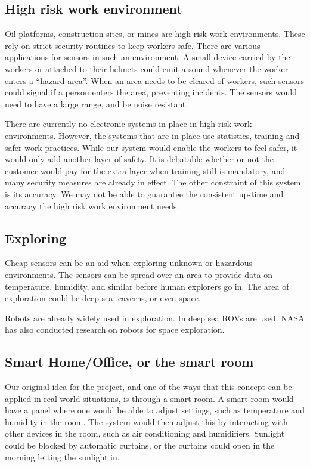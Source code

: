\documentclass[../document.tex]{subfiles}
\begin{document}
\subsection*{High risk work environment}
Oil platforms, construction sites, or mines are high risk work environments. These rely on strict security routines to keep workers safe. There are various applications for sensors in such an environment. A small device carried by the workers or attached to their helmets could emit a sound whenever the worker enters a ``hazard area''. When an area needs to be cleared of workers, such sensors could signal if a person enters the area, preventing incidents. The sensors would need to have a large range, and be noise resistant.

There are currently no electronic systems in place in high risk work environments. However, the systems that are in place use statistics, training and safer work practices. While our system would enable the workers to feel safer, it would only add another layer of safety. It is debatable whether or not the customer would pay for the extra layer when training still is mandatory, and many security measures are already in effect. The other constraint of this system is its accuracy. We may not be able to guarantee the consistent up-time and accuracy the high risk work environment needs.

\subsection*{Exploring}
Cheap sensors can be an aid when exploring unknown or hazardous environments. The sensors can be spread over an area to provide data on temperature, humidity, and similar before human explorers go in. The area of exploration could be deep sea, caverns, or even space.

Robots are already widely used in exploration. In deep sea ROVs are used. NASA has also conducted research on robots for space exploration.

\subsection*{Smart Home/Office, or the smart room}
Our original idea for the project, and one of the ways that this concept can be applied in real world situations, is through a smart room. A smart room would have a panel where one would be able to adjust settings, such as temperature and humidity in the room. The system would then adjust this by interacting with other devices in the room, such as air conditioning and humidifiers. Sunlight could be blocked by automatic curtains, or the curtains could open in the morning letting the sunlight in.
\end{document}
